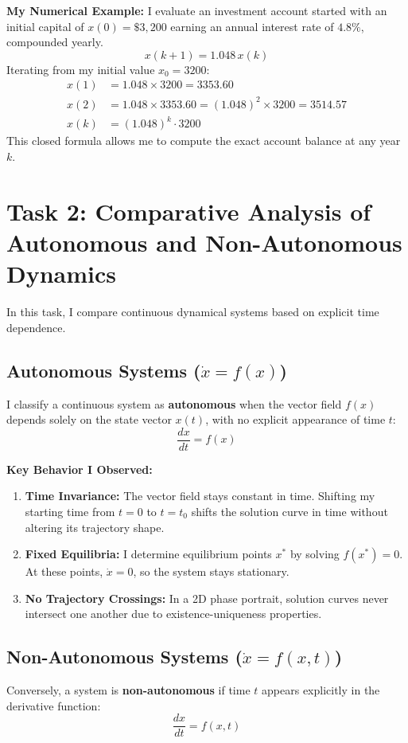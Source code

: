 \documentclass[12pt,a4paper]{article}
\theoremstyle{definition}
\theoremstyle{plain}
\begin{document}
\textbf{My Numerical Example:} I evaluate an investment account started with an initial capital of $x(0) = \$3,200$ earning an annual interest rate of $4.8\%$, compounded yearly. 
\[
x(k+1) = 1.048 \, x(k)
\]
Iterating from my initial value $x_0 = 3200$:
\begin{align*}
x(1) &= 1.048 \times 3200 = 3353.60 \\
x(2) &= 1.048 \times 3353.60 = (1.048)^2 \times 3200 = 3514.57 \\
x(k) &= (1.048)^k \cdot 3200
\end{align*}
This closed formula allows me to compute the exact account balance at any year $k$.

\newpage
\section{Task 2: Comparative Analysis of Autonomous and Non-Autonomous Dynamics}

In this task, I compare continuous dynamical systems based on explicit time dependence.

\subsection{Autonomous Systems ($\dot{x} = f(x)$)}
I classify a continuous system as \textbf{autonomous} when the vector field $f(x)$ depends solely on the state vector $x(t)$, with no explicit appearance of time $t$:
\[
\frac{dx}{dt} = f(x)
\]

\textbf{Key Behavior I Observed:}
\begin{enumerate}
    \item \textbf{Time Invariance:} The vector field stays constant in time. Shifting my starting time from $t=0$ to $t=t_0$ shifts the solution curve in time without altering its trajectory shape.
    \item \textbf{Fixed Equilibria:} I determine equilibrium points $x^*$ by solving $f(x^*) = 0$. At these points, $\dot{x} = 0$, so the system stays stationary.
    \item \textbf{No Trajectory Crossings:} In a 2D phase portrait, solution curves never intersect one another due to existence-uniqueness properties.
\end{enumerate}

\subsection{Non-Autonomous Systems ($\dot{x} = f(x, t)$)}
Conversely, a system is \textbf{non-autonomous} if time $t$ appears explicitly in the derivative function:
\[
\frac{dx}{dt} = f(x, t)
\]
\end{document}
